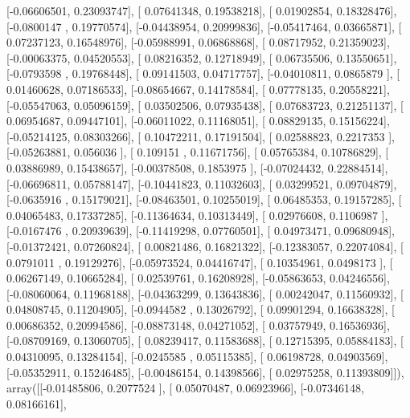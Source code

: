 \documentclass{article}
\begin{document}
       [-0.06606501,  0.23093747],
       [ 0.07641348,  0.19538218],
       [ 0.01902854,  0.18328476],
       [-0.0800147 ,  0.19770574],
       [-0.04438954,  0.20999836],
       [-0.05417464,  0.03665871],
       [ 0.07237123,  0.16548976],
       [-0.05988991,  0.06868868],
       [ 0.08717952,  0.21359023],
       [-0.00063375,  0.04520553],
       [ 0.08216352,  0.12718949],
       [ 0.06735506,  0.13550651],
       [-0.0793598 ,  0.19768448],
       [ 0.09141503,  0.04717757],
       [-0.04010811,  0.0865879 ],
       [ 0.01460628,  0.07186533],
       [-0.08654667,  0.14178584],
       [ 0.07778135,  0.20558221],
       [-0.05547063,  0.05096159],
       [ 0.03502506,  0.07935438],
       [ 0.07683723,  0.21251137],
       [ 0.06954687,  0.09447101],
       [-0.06011022,  0.11168051],
       [ 0.08829135,  0.15156224],
       [-0.05214125,  0.08303266],
       [ 0.10472211,  0.17191504],
       [ 0.02588823,  0.2217353 ],
       [-0.05263881,  0.056036  ],
       [ 0.109151  ,  0.11671756],
       [ 0.05765384,  0.10786829],
       [ 0.03886989,  0.15438657],
       [-0.00378508,  0.1853975 ],
       [-0.07024432,  0.22884514],
       [-0.06696811,  0.05788147],
       [-0.10441823,  0.11032603],
       [ 0.03299521,  0.09704879],
       [-0.0635916 ,  0.15179021],
       [-0.08463501,  0.10255019],
       [ 0.06485353,  0.19157285],
       [ 0.04065483,  0.17337285],
       [-0.11364634,  0.10313449],
       [ 0.02976608,  0.1106987 ],
       [-0.0167476 ,  0.20939639],
       [-0.11419298,  0.07760501],
       [ 0.04973471,  0.09680948],
       [-0.01372421,  0.07260824],
       [ 0.00821486,  0.16821322],
       [-0.12383057,  0.22074084],
       [ 0.0791011 ,  0.19129276],
       [-0.05973524,  0.04416747],
       [ 0.10354961,  0.0498173 ],
       [ 0.06267149,  0.10665284],
       [ 0.02539761,  0.16208928],
       [-0.05863653,  0.04246556],
       [-0.08060064,  0.11968188],
       [-0.04363299,  0.13643836],
       [ 0.00242047,  0.11560932],
       [ 0.04808745,  0.11204905],
       [-0.0944582 ,  0.13026792],
       [ 0.09901294,  0.16638328],
       [ 0.00686352,  0.20994586],
       [-0.08873148,  0.04271052],
       [ 0.03757949,  0.16536936],
       [-0.08709169,  0.13060705],
       [ 0.08239417,  0.11583688],
       [ 0.12715395,  0.05884183],
       [ 0.04310095,  0.13284154],
       [-0.0245585 ,  0.05115385],
       [ 0.06198728,  0.04903569],
       [-0.05352911,  0.15246485],
       [-0.00486154,  0.14398566],
       [ 0.02975258,  0.11393809]]), array([[-0.01485806,  0.2077524 ],
       [ 0.05070487,  0.06923966],
       [-0.07346148,  0.08166161],
\end{document}
